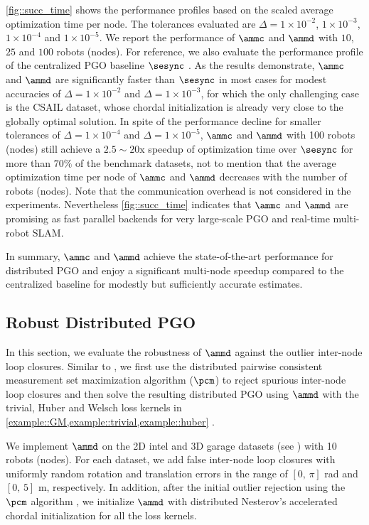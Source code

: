 \cref{fig::succ_time} shows the performance profiles based on the scaled average optimization time per node. The tolerances evaluated are $\Delta=1\times10^{-2}$, $1\times10^{-3}$, $1\times10^{-4}$ and $1\times10^{-5}$. We report the performance of $\ammc$ and $\ammd$ with $10$, $25$ and $100$ robots (nodes). For reference, we also evaluate the performance profile of the centralized PGO baseline $\sesync$ \cite{rosen2016se}.  As the results demonstrate, $\ammc$ and $\ammd$ are significantly faster than $\sesync$ \cite{rosen2016se} in most cases for modest accuracies of $\Delta=1\times 10^{-2}$ and $\Delta=1\times 10^{-3}$, for which the only challenging case is the {\sf CSAIL} dataset, whose chordal initialization is already very close to the globally optimal solution.  In spite of the performance decline for smaller tolerances of $\Delta=1\times 10^{-4}$ and $\Delta=1\times 10^{-5}$, $\ammc$ and $\ammd$ with 100 robots (nodes) still achieve a $2.5\sim 20\mathrm{x}$ speedup of optimization time over $\sesync$ for more than $70\%$ of the benchmark datasets, not to mention that the average optimization time per node of $\ammc$ and $\ammd$ decreases with the number of robots (nodes). {\highlight Note that the communication overhead is not considered in the experiments.} Nevertheless  \cref{fig::succ_time} indicates that $\ammc$ and $\ammd$ are promising  as fast parallel backends for very large-scale PGO and real-time multi-robot SLAM.

In summary, $\ammc$ and $\ammd$ achieve the state-of-the-art performance for distributed PGO and enjoy a significant multi-node speedup compared to the centralized baseline \cite{rosen2016se} for modestly but sufficiently accurate estimates.

\subsection{Robust Distributed PGO} 

In this section, we evaluate the robustness of $\ammd$ against the outlier inter-node loop closures. Similar to \cite{chang2020kimera,lajoie2020door}, we first use the distributed pairwise consistent measurement set maximization algorithm ($\pcm$) \cite{mangelson2018pairwise} to reject spurious inter-node loop closures and then solve the resulting distributed PGO using $\ammd$ with the trivial, Huber  and Welsch loss kernels in \cref{example::GM,example::trivial,example::huber} . 

We implement $\ammd$ on the 2D {\sf intel} and 3D {\sf garage} datasets (see \datasetinfo) with 10 robots (nodes). For each dataset, we add false inter-node loop closures with uniformly random rotation and translation errors in the range of $[0,\,\pi]$ rad and $[0,\,5]$ m, respectively. In addition, after the initial outlier rejection using the $\pcm$ algorithm \cite{mangelson2018pairwise}, we initialize $\ammd$ with distributed Nesterov's accelerated chordal initialization \cite{fan2020mm} for all the loss kernels. 


